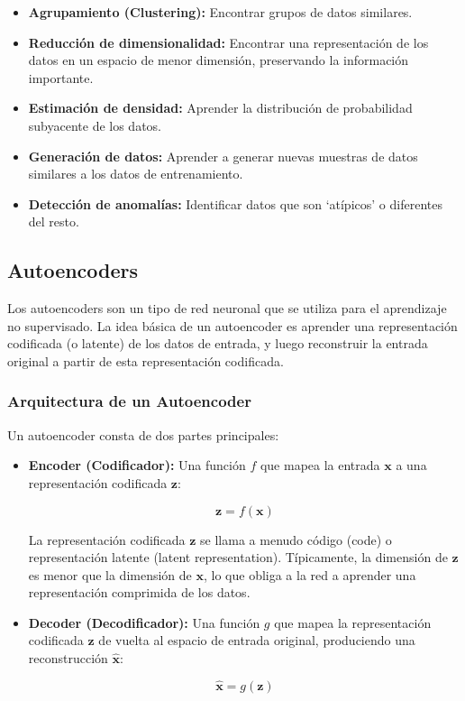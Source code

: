 \documentclass{article}
\begin{document}
\begin{itemize}
    \item \textbf{Agrupamiento (Clustering):}  Encontrar grupos de datos similares.
    \item \textbf{Reducción de dimensionalidad:}  Encontrar una representación de los datos en un espacio de menor dimensión, preservando la información importante.
    \item \textbf{Estimación de densidad:}  Aprender la distribución de probabilidad subyacente de los datos.
    \item \textbf{Generación de datos:}  Aprender a generar nuevas muestras de datos similares a los datos de entrenamiento.
    \item \textbf{Detección de anomalías:} Identificar datos que son `atípicos' o diferentes del resto.
\end{itemize}

\subsection{Autoencoders}

Los autoencoders son un tipo de red neuronal que se utiliza para el aprendizaje no supervisado.  La idea básica de un autoencoder es aprender una representación codificada (o latente) de los datos de entrada, y luego reconstruir la entrada original a partir de esta representación codificada.

\subsubsection{Arquitectura de un Autoencoder}

Un autoencoder consta de dos partes principales:

\begin{itemize}
    \item \textbf{Encoder (Codificador):}  Una función \(f\) que mapea la entrada \(\mathbf{x}\) a una representación codificada \(\mathbf{z}\):

    \[
    \mathbf{z} = f(\mathbf{x})
    \]

    La representación codificada \(\mathbf{z}\) se llama a menudo código (code) o representación latente (latent representation).  Típicamente, la dimensión de \(\mathbf{z}\) es menor que la dimensión de \(\mathbf{x}\), lo que obliga a la red a aprender una representación comprimida de los datos.
    \item \textbf{Decoder (Decodificador):}  Una función \(g\) que mapea la representación codificada \(\mathbf{z}\) de vuelta al espacio de entrada original, produciendo una reconstrucción \(\hat{\mathbf{x}}\):

    \[
    \hat{\mathbf{x}} = g(\mathbf{z})
    \]
\end{itemize}
\end{document}
